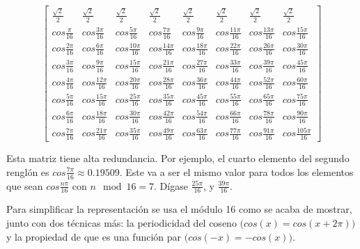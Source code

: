 {\begin{equation}
    \label{eq:dct-matrix}
    \begin{bmatrix}
        \frac{\sqrt{2}}{2} & \frac{\sqrt{2}}{2} & \frac{\sqrt{2}}{2} & \frac{\sqrt{2}}{2} & \frac{\sqrt{2}}{2} & \frac{\sqrt{2}}{2} & \frac{\sqrt{2}}{2} & \frac{\sqrt{2}}{2} \\
        cos\frac{\pi}{16} & cos\frac{3\pi}{16}& cos\frac{5\pi}{16}& cos\frac{7\pi}{16}& cos\frac{9\pi}{16}& cos\frac{11\pi}{16}& cos\frac{13\pi}{16}& cos\frac{15\pi}{16} \\
        cos\frac{2\pi}{16} & cos\frac{6\pi}{16}& cos\frac{10\pi}{16}& cos\frac{14\pi}{16}& cos\frac{18\pi}{16}& cos\frac{22\pi}{16}& cos\frac{26\pi}{16}& cos\frac{30\pi}{16} \\
        cos\frac{3\pi}{16} & cos\frac{9\pi}{16}& cos\frac{15\pi}{16}& cos\frac{21\pi}{16}& cos\frac{27\pi}{16}& cos\frac{33\pi}{16}& cos\frac{39\pi}{16}& cos\frac{45\pi}{16} \\
        cos\frac{4\pi}{16} & cos\frac{12\pi}{16}& cos\frac{20\pi}{16}& cos\frac{28\pi}{16}& cos\frac{36\pi}{16}& cos\frac{44\pi}{16}& cos\frac{52\pi}{16}& cos\frac{60\pi}{16} \\
        cos\frac{5\pi}{16} & cos\frac{15\pi}{16}& cos\frac{25\pi}{16}& cos\frac{35\pi}{16}& cos\frac{45\pi}{16}& cos\frac{55\pi}{16}& cos\frac{65\pi}{16}& cos\frac{75\pi}{16} \\
        cos\frac{6\pi}{16} & cos\frac{18\pi}{16}& cos\frac{30\pi}{16}& cos\frac{42\pi}{16}& cos\frac{54\pi}{16}& cos\frac{66\pi}{16}& cos\frac{78\pi}{16}& cos\frac{90\pi}{16} \\
        cos\frac{7\pi}{16} & cos\frac{21\pi}{16}& cos\frac{35\pi}{16}& cos\frac{49\pi}{16}& cos\frac{63\pi}{16}& cos\frac{77\pi}{16}& cos\frac{91\pi}{16}& cos\frac{105\pi}{16}
    \end{bmatrix}
\end{equation}

Esta matriz tiene alta redundancia. Por ejemplo, el cuarto elemento del segundo renglón es $cos\frac{7\pi}{16} \approx 0.19509$. Este va a ser el mismo valor para todos los elementos que sean $cos\frac{n\pi}{16}$ con $n \mod 16 = 7$. Dígase $\frac{25\pi}{16}$, y $\frac{39\pi}{16}$.

Para simplificar la representación se usa el módulo 16 como se acaba de mostrar, junto con dos técnicas más: la periodicidad del coseno $\Big( cos(x) = cos(x + 2\pi) \Big)$ y la propiedad de que es una función par $\Big( cos(-x) = -cos(x) \Big)$.

}
